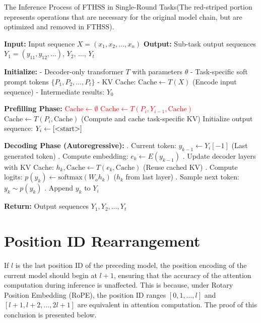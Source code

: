 \begin{algorithm*}[t]
\caption{The Inference Process of FTHSS in Single-Round Tasks(The red-striped portion represents operations that are necessary for the original model chain, but are optimized and removed in FTHSS).}
\label{alg:multi_prompt_inference}
\begin{algorithmic}[1]
\STATE \textbf{Input:} Input sequence $X = (x_1, x_2, \dots, x_n)$
\STATE \textbf{Output:} Sub-task output sequences $Y_1 = (y_{11}, y_{12}, \dots)$, $Y_2$, $\dots$, $Y_t$

\STATE \textbf{Initialize:} 
\STATE \quad - Decoder-only transformer $T$ with parameters $\theta$
\STATE \quad - Task-specific soft prompt tokens $\{P_1, P_2, \dots, P_t\}$
\STATE \quad - KV Cache: $\text{Cache} \gets T(X)$ \quad (Encode input sequence)
\STATE \quad - Intermediate results: $Y_0$

\STATE \textbf{Prefilling Phase:}
\STATE \textcolor{red}{\sout{$\text{Cache} \gets \emptyset$}}
\STATE \textcolor{red}{\sout{$\text{Cache} \gets T(P_i, Y_{i-1}, \text{Cache})$}}
\STATE $\text{Cache} \gets T(P_i, \text{Cache})$ \quad (Compute and cache task-specific KV)
\STATE Initialize output sequence: $Y_i \gets [\text{\textless start\textgreater}]$

\STATE \textbf{Decoding Phase (Autoregressive):}
\STATE {}. Current token: $y_{k-1} \gets Y_i[-1]$ \quad (Last generated token)
\STATE {}. Compute embedding: $e_k \gets E(y_{k-1})$
\STATE {}. Update decoder layers with KV Cache:
\STATE \quad \quad $h_k, \text{Cache} \gets T(e_k, \text{Cache})$ \quad (Reuse cached KV)
\STATE {}. Compute logits: $p(y_k) \gets \text{softmax}(W_o h_k)$ \quad ($h_k$ from last layer)
\STATE {}. Sample next token: $y_k \sim p(y_k)$
\STATE {}. Append $y_k$ to $Y_i$
\ENDFOR
\ENDFOR

\STATE \textbf{Return:} Output sequences $Y_1, Y_2, \dots, Y_t$
\end{algorithmic}
\end{algorithm*}



\section{Position ID Rearrangement}
\label{sec:position}
If  $l$ is the last position ID of the preceding model, the position encoding of the current model should begin at $l+1$, ensuring that the accuracy of the attention computation during inference is unaffected. This is because, under Rotary Position Embedding (RoPE), the position ID ranges $[0, 1, \dots, l]$ and $[l+1, l+2, \dots, 2l+1]$ are equivalent in attention computation. The proof of this conclusion is presented below.

